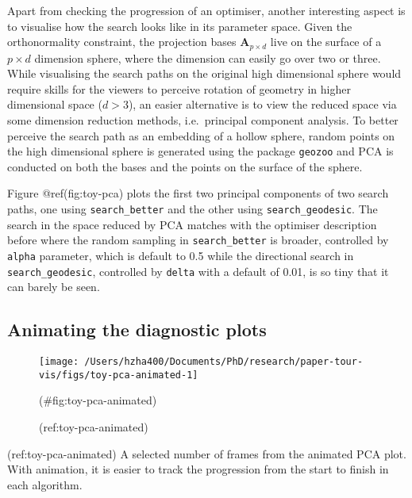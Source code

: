 Apart from checking the progression of an optimiser, another interesting aspect is to visualise how the search looks like in its parameter space. Given the orthonormality constraint, the projection bases \(\mathbf{A}_{p \times d}\) live on the surface of a \(p \times d\) dimension sphere, where the dimension can easily go over two or three. While visualising the search paths on the original high dimensional sphere would require skills for the viewers to perceive rotation of geometry in higher dimensional space (\(d > 3\)), an easier alternative is to view the reduced space via some dimension reduction methods, i.e.~principal component analysis. To better perceive the search path as an embedding of a hollow sphere, random points on the high dimensional sphere is generated using the package \texttt{geozoo} and PCA is conducted on both the bases and the points on the surface of the sphere.

Figure @ref(fig:toy-pca) plots the first two principal components of two search paths, one using \texttt{search\_better} and the other using \texttt{search\_geodesic}. The search in the space reduced by PCA matches with the optimiser description before where the random sampling in \texttt{search\_better} is broader, controlled by \texttt{alpha} parameter, which is default to 0.5 while the directional search in \texttt{search\_geodesic}, controlled by \texttt{delta} with a default of 0.01, is so tiny that it can barely be seen.

\hypertarget{animating-the-diagnostic-plots}{%
\subsection{Animating the diagnostic plots}\label{animating-the-diagnostic-plots}}

\begin{Schunk}
\begin{figure}

{\centering \texttt{[image: /Users/hzha400/Documents/PhD/research/paper-tour-vis/figs/toy-pca-animated-1]} 

}

\caption[(ref:toy-pca-animated)]{(ref:toy-pca-animated)}(\#fig:toy-pca-animated)
\end{figure}
\end{Schunk}

(ref:toy-pca-animated) A selected number of frames from the animated PCA plot. With animation, it is easier to track the progression from the start to finish in each algorithm.

